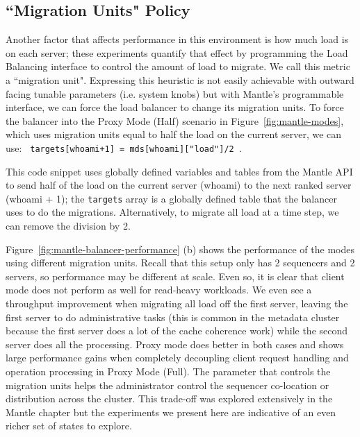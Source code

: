 \subsection{``Migration Units" Policy}
\label{sec:feature-migration-units}

Another factor that affects performance in this environment is how much load is
on each server; these experiments quantify that effect by programming the Load
Balancing interface to control the amount of load to migrate. We call this
metric a ``migration unit".  Expressing this heuristic is not easily achievable
with outward facing tunable parameters (i.e. system knobs) but with Mantle's
programmable interface, we can force the load balancer to change its migration
units. To force the balancer into the Proxy Mode (Half) scenario in
Figure~\ref{fig:mantle-modes}, which uses migration units equal to half the
load on the current server, we can use: \texttt{ targets[whoami+1] =
mds[whoami]["load"]/2 }.

This code snippet uses globally defined variables and tables from the Mantle
API to send half of the load on the current server (whoami) to the next ranked
server (whoami + 1); the \texttt{targets} array is a globally defined table
that the balancer uses to do the migrations.  Alternatively, to migrate all
load at a time step, we can remove the division by 2.


Figure~\ref{fig:mantle-balancer-performance} (b) shows the performance of the
modes using different migration units. Recall that this setup only has 2
sequencers and 2 servers, so performance may be different at scale. Even so, it
is clear that client mode does not perform as well for read-heavy workloads. We
even see a throughput improvement when migrating all load off the first server,
leaving the first server to do administrative tasks (this is common in the
metadata cluster because the first server does a lot of the cache coherence
work) while the second server does all the processing. Proxy mode does better
in both cases and shows large performance gains when completely decoupling
client request handling and operation processing in Proxy Mode (Full).  The
parameter that controls the migration units helps the administrator control the
sequencer co-location or distribution across the cluster. This trade-off was
explored extensively in the Mantle chapter but the experiments we present here
are indicative of an even richer set of states to explore.

